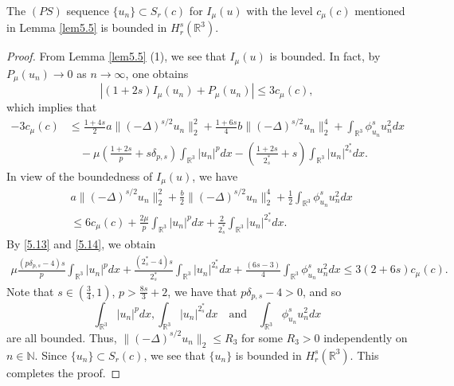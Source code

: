 \documentclass[reqno]{amsart}
\begin{document}
\begin{lemma}\label{lem5.6} 
The $(PS)$ sequence $\{u_n\} \subset S_{r}(c)$ for $I_\mu(u)$ with the level 
$c_\mu(c)$ mentioned in Lemma \ref{lem5.5} is bounded in $H^s_r(\mathbb{R}^3)$.
\end{lemma}

\begin{proof}  
From Lemma  \ref{lem5.5} (1), we see that $I_\mu(u)$ is bounded. 
In fact, by $P_\mu(u_n)\to 0$ as $n\to \infty$, one obtains
$$
|(1+2s)I_\mu(u_n)+P_\mu(u_n)|\leq 3c_\mu(c),
$$
which implies that
\begin{equation}\label{5.13}
\begin{split}
-3c_\mu(c)&\leq \frac{1+4s}{2}a\|(-\Delta)^{s/2}u_n\|^2_2+\frac{1+6s}{4}b
\|(-\Delta)^{s/2}u_n\|^4_2+\int_{\mathbb{R}^3}\phi^s_{u_n}u^2_ndx\\
&\quad -\mu(\frac{1+2s}{p}+s\delta_{p,s})\int_{\mathbb{R}^3}|u_n|^pdx
 -(\frac{1+2s}{2^*_s}+s)\int_{\mathbb{R}^3}|u_n|^{2^*_s}dx.
\end{split}
\end{equation}
In view of the boundedness of $I_\mu(u)$, we have
\begin{equation}\label{5.14}
\begin{split}
&a\|(-\Delta)^{s/2}u_n\|^2_2+\frac{b}{2}\|(-\Delta)^{s/2}u_n\|^4_2
 +\frac{1}{2}\int_{\mathbb{R}^3}\phi^s_{u_n}u^2_ndx\\
&\leq 6c_\mu(c)+\frac{2\mu}{p}\int_{\mathbb{R}^3}|u_n|^pdx
 +\frac{2}{2^*_s}\int_{\mathbb{R}^3}|u_n|^{2^*_s}dx.
\end{split}
\end{equation}
By \eqref{5.13} and \eqref{5.14}, we obtain
\begin{align*} %
\mu \frac{(p\delta_{p,s}-4)s}{p}\int_{\mathbb{R}^3}|u_n|^pdx
+\frac{(2^*_s-4)s}{2^*_s}\int_{\mathbb{R}^3}|u_n|^{2^*_s}dx
+\frac{(6s-3)}{4}\int_{\mathbb{R}^3}\phi^s_{u_n}u^2_ndx\leq 3(2+6s)c_\mu(c).
\end{align*}
Note that $s\in(\frac{3}{4}, 1)$, $p>\frac{8s}{3}+2$, we have that 
$p\delta_{p,s}-4>0$, and so
$$
\int_{\mathbb{R}^3}|u_n|^pdx, \int_{\mathbb{R}^3}|u_n|^{2^*_s}dx 
\quad\text{and}\quad
\int_{\mathbb{R}^3}\phi^s_{u_n}u^2_ndx 
$$
are all bounded. Thus, $\|(-\Delta)^{s/2}u_n\|_2\leq R_3$ for some $R_3>0$ 
independently on $n\in \mathbb{N}$. Since $\{u_n\}\subset S_{r}(c)$, we see that 
$\{u_n\}$ is bounded in $H^s_r(\mathbb{R}^3)$.  
This completes the proof.
\end{proof}
\end{document}
